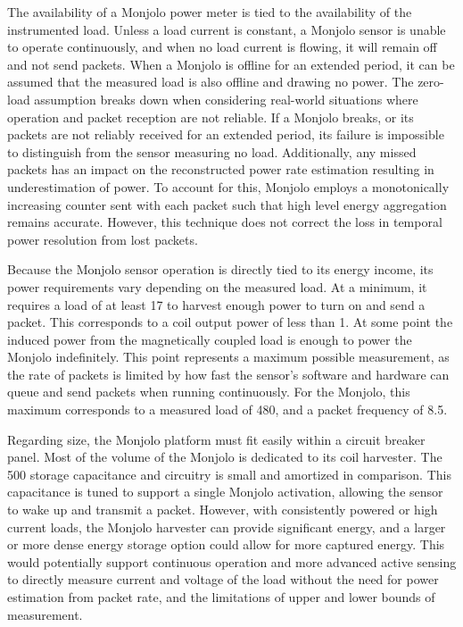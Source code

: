 The availability of a Monjolo power meter is tied to the availability of the instrumented load. Unless a load current is constant, a Monjolo sensor is unable to operate continuously, and when no load current is flowing, it will remain off and not send packets.
When a Monjolo is offline for an extended period, it can be assumed that the measured load is also offline and drawing no power.
The zero-load assumption breaks down when considering real-world situations where operation and packet reception are not reliable.
If a Monjolo breaks, or its packets are not reliably received for an extended period, its failure is impossible to distinguish from the sensor measuring no load.
Additionally, any missed packets has an impact on the reconstructed power rate estimation resulting in underestimation of power.
To account for this, Monjolo employs a monotonically increasing counter sent with each packet such that high level energy aggregation remains accurate.
However, this technique does not correct the loss in temporal power resolution from lost packets.

Because the Monjolo sensor operation is directly tied to its energy income, its power requirements vary depending on the measured load. At a minimum, it requires a load of at least 17\ssi{\watt} to harvest enough power to turn on and send a packet. This corresponds to a coil output power of less than 1\ssi{\milli\watt}. At some point the induced power from the magnetically coupled load is enough to power the Monjolo indefinitely. This point represents a maximum possible measurement, as the rate of packets is limited by how fast the sensor's software and hardware can queue and send packets when running continuously. For the Monjolo, this maximum corresponds to a measured load of 480\ssi{\watt}, and a packet frequency of 8.5\ssi{\hertz}.

Regarding size, the Monjolo platform must fit easily within a circuit breaker panel. Most of the volume of the Monjolo is dedicated to its coil harvester.
The 500\ssi{\micro\farad} storage capacitance and circuitry is small and amortized in comparison.
This capacitance is tuned to support a single Monjolo activation, allowing the sensor to wake up and transmit a packet.
However, with consistently powered or high current loads, the Monjolo harvester can provide significant energy, and a larger or more dense energy storage option could allow for more captured energy.
This would potentially support continuous operation and more advanced active sensing to directly measure current and voltage of the load without the need for power estimation from packet rate, and the limitations of upper and lower bounds of measurement.

